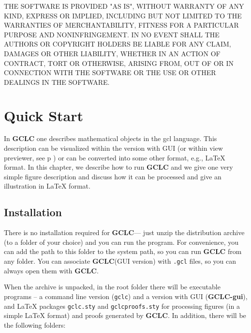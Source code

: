 \documentclass[a4paper]{book}
\newcommand{\gclc}{{\bfseries GCLC}\xspace}
\newcommand{\gclcgui}{{\bfseries GCLC-gui}\xspace}
\begin{document}
THE SOFTWARE IS PROVIDED "AS IS", WITHOUT WARRANTY OF ANY KIND, EXPRESS OR
IMPLIED, INCLUDING BUT NOT LIMITED TO THE WARRANTIES OF MERCHANTABILITY,
FITNESS FOR A PARTICULAR PURPOSE AND NONINFRINGEMENT. IN NO EVENT SHALL THE
AUTHORS OR COPYRIGHT HOLDERS BE LIABLE FOR ANY CLAIM, DAMAGES OR OTHER
LIABILITY, WHETHER IN AN ACTION OF CONTRACT, TORT OR OTHERWISE, ARISING FROM,
OUT OF OR IN CONNECTION WITH THE SOFTWARE OR THE USE OR OTHER DEALINGS IN THE
SOFTWARE.


\chapter{Quick Start}

In \gclc one describes mathematical objects in the {\sc gcl}
language. This description can be visualized within the version with GUI
(or within {\sc view} previewer, see p \pageref{p:view}) or can be converted 
into some other format, e.g., \LaTeX{} format. In this chapter, we describe
how to run \gclc and we give one very simple figure description and 
discuss how it can be processed and give an illustration in \LaTeX{}
format.


\section{Installation}

There is no installation required for \gclc --- just unzip
the distribution archive (to a folder of your choice) and you can
run the program. For convenience, you can add the path to this folder
to the system path, so you can run \gclc from any folder. 
You can associate \gclc (GUI version) with \verb|.gcl| files,
so you can always open them with \gclc.

When the archive is unpacked, in the root folder there will be
executable programs -- a command line version (\verb|gclc|) and 
a version with GUI (\gclcgui), and \LaTeX{} packages \verb|gclc.sty|
and \verb|gclcproofs.sty| for processing figures
(in a simple \LaTeX{} format) and proofs generated by \gclc.
In addition, there will be the following folders:
\end{document}
